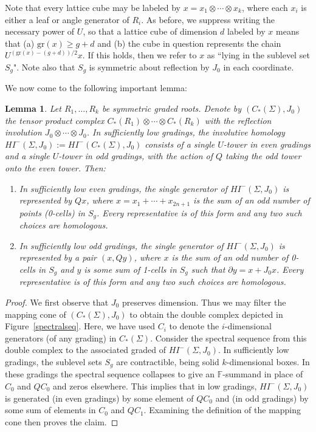 \documentclass[11 pt]{amsart}
\newtheorem {lemma}[theorem]{Lemma}
\theoremstyle{remark}
\def\gr{\mathrm{gr}}
\def\HIm{\mathit{HI}^-}
\begin{document}
Note that every lattice cube may be labeled by $x = x_1 \otimes \cdots \otimes x_k$, where each $x_i$ is either a leaf or angle generator of $R_i$. As before, we suppress writing the necessary power of $U$, so that a lattice cube of dimension $d$ labeled by $x$ means that (a) $\gr(x) \geq g + d$ and (b) the cube in question represents the chain $U^{(\gr(x) - (g + d))/2}x$. If this holds, then we refer to $x$ as ``lying in the sublevel set $S_g$". Note also that $S_g$ is symmetric about reflection by $J_0$ in each coordinate. 

We now come to the following important lemma:
\begin{lemma} \label{lowgradinggenerators}
Let $R_1, \ldots, R_k$ be symmetric graded roots. Denote by $(C_*(\Sigma), J_0)$ the tensor product complex $C_*(R_1) \otimes \cdots \otimes C_*(R_k)$ with the reflection involution $J_0 \otimes \cdots \otimes J_0$. In sufficiently low gradings, the involutive homology $\HIm(\Sigma, J_0) := \HIm(C_*(\Sigma), J_0)$ consists of a single $U$-tower in even gradings and a single $U$-tower in odd gradings, with the action of $Q$ taking the odd tower onto the even tower. Then:
\begin{enumerate}
\item In sufficiently low even gradings, the single generator of $\HIm(\Sigma, J_0)$ is represented by $Qx$, where $x = x_1 + \cdots + x_{2n+1}$ is the sum of an odd number of points (0-cells) in $S_g$. Every representative is of this form and any two such choices are homologous.
\item In sufficiently low odd gradings, the single generator of $\HIm(\Sigma, J_0)$ is represented by a pair $(x, Qy)$, where $x$ is the sum of an odd number of 0-cells in $S_g$ and $y$ is some sum of 1-cells in $S_g$ such that $\partial y = x + J_0x$. Every representative is of this form and any two such choices are homologous.
\end{enumerate}
\end{lemma}
\begin{proof}
We first observe that $J_0$ preserves dimension. Thus we may filter the mapping cone of $(C_*(\Sigma), J_0)$ to obtain the double complex depicted in Figure~\ref{spectralseq}. Here, we have used $C_i$ to denote the $i$-dimensional generators (of any grading) in $C_*(\Sigma)$. Consider the spectral sequence from this double complex to the associated graded of $\HIm(\Sigma, J_0)$. In sufficiently low gradings, the sublevel sets $S_g$ are contractible, being solid $k$-dimensional boxes. In these gradings the spectral sequence collapses to give an $\mathbb{F}$-summand in place of $C_0$ and $QC_0$ and zeros elsewhere. This implies that in low gradings, $\HIm(\Sigma, J_0)$ is generated (in even gradings) by some element of $QC_0$ and (in odd gradings) by some sum of elements in $C_0$ and $QC_1$. Examining the definition of the mapping cone then proves the claim.
\end{proof}
\end{document}
